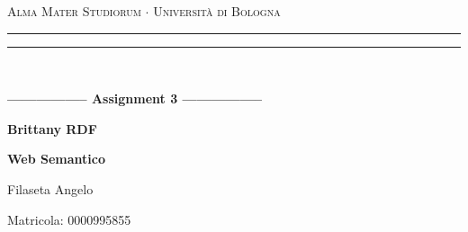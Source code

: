 \begin{titlepage}
    \begin{center}
        {{\Large{\textsc{Alma Mater Studiorum $\cdot$ Università di Bologna}}}}
        \rule[0.1cm]{15.8cm}{0.1mm}
        \rule[0.5cm]{15.8cm}{0.6mm}
        \\
        \vspace{3mm}
    \end{center}
    \vspace{2mm}
    \begin{center}
        {\LARGE{\bf{----------------- Assignment 3 -----------------}}}
        \vspace{5mm} \par \noindent
        {\Huge{\bf{Brittany RDF}}}
        \vspace{10mm} \par \noindent
        {\LARGE \textbf{Web Semantico}}
        \vspace{15mm} \par \noindent
        {\Large Filaseta Angelo}
        \vspace{15mm} \par \noindent
        {\Large Matricola: 0000995855}
    \end{center}
    \hfill
    \vspace{40mm}
\end{titlepage}

